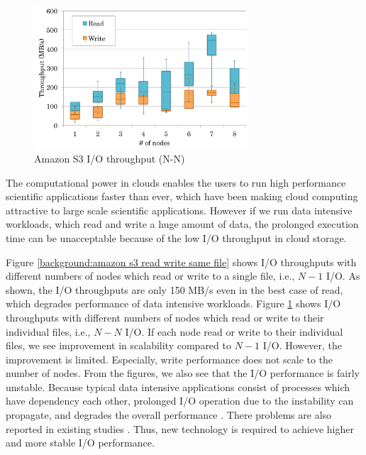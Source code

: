\begin{figure}[t]
\label{background:amazon s3 read write different file}
\includegraphics[width=8cm]{img/s3_read_write_different_file-2}
\caption{Amazon S3 I/O throughput (N-N)}
\end{figure}



The computational power in clouds enables the users to run high performance
scientific applications faster than ever, which have been making cloud
computing attractive to large scale scientific applications.
However if we run data intensive workloads, which read and write a huge amount
of data, the prolonged execution time can be unacceptable because of the low I/O
throughput in cloud storage.
\par
Figure \ref{background:amazon s3 read write same file} shows I/O throughputs
with different numbers of nodes which read or write to a single file, i.e.,
$N-1$ I/O.
As shown, the I/O throughputs are only 150 MB/s even in the best case of read,
which degrades performance of data intensive workloads. 
Figure \ref{background:amazon s3 read write different file} shows I/O
throughputs with different numbers of nodes which read or write to their
individual files, i.e., $N-N$ I/O. If each node read or write to their
individual files, we see improvement in scalability compared to $N-1$ I/O. 
However, the improvement is limited. Especially, write performance does not
scale to the number of nodes. From the figures, we also see that the I/O
performance is fairly unstable. Because typical data intensive applications consist of
processes which have dependency each other, prolonged I/O
operation due to the instability can propagate, and degrades the overall
performance \cite{montage, povray}.
There problems are also reported in existing studies \cite{Chiba,Transactions_a_la_carte, Interactive_Use_of_Cloud_Services,Amazon_S3_for_Science_Grids,
anevaluation}. 
Thus, new technology is required to achieve higher and more stable I/O
performance.

